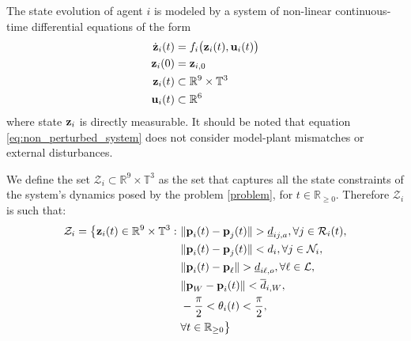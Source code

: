 The state evolution of agent $i$ is modeled by a system of non-linear
continuous-time differential equations of the form
\begin{align}
  \dot{\bm{\mathbf{z}}}_i(t) &= f_i \big(\bm{\mathbf{z}}_i (t), \bm{\mathbf{u}}_i (t)\big) \label{eq:non_perturbed_system}\\
  \bm{\mathbf{z}}_i(0) &= \bm{\mathbf{z}}_{i,0} \\
  \bm{\mathbf{z}}_i (t) & \subset \mathbb{R}^{9} \times \mathbb{T}^3 \\
  \bm{\mathbf{u}}_i (t) & \subset \mathbb{R}^6
\end{align}
where state $\bm{\mathbf{z}}_i$ is directly measurable. It should be noted that
equation \eqref{eq:non_perturbed_system} does not consider model-plant
mismatches or external disturbances.

We define the set $\mathcal{Z}_i \subset \mathbb{R}^{9} \times \mathbb{T}^3$
as the set that captures all the state constraints of the system's dynamics
posed by the problem \eqref{problem}, for $t \in \mathbb{R}_{\geq 0}$.
Therefore $\mathcal{Z}_i$ is such that:
\begin{align}
  \mathcal{Z}_i = \big\{\bm{\mathbf{z}}_i(t) \in \mathbb{R}^{9}\times \mathbb{T}^3 : \
      & \|\bm{\mathbf{p}}_i(t) - \bm{\mathbf{p}}_j(t)\| > \underline{d}_{ij,a}, \forall j \in \mathcal{R}_i(t), \label{constraint:p_1}\\
      & \|\bm{\mathbf{p}}_i(t) - \bm{\mathbf{p}}_j(t)\| < d_i, \forall j \in \mathcal{N}_i, \\
      & \|\bm{\mathbf{p}}_i(t) - \bm{\mathbf{p}}_{\ell}\| > \underline{d}_{i\ell,o}, \forall \ell \in \mathcal{L}, \\
      & \|\bm{\mathbf{p}}_W - \bm{\mathbf{p}}_i(t)\| < \overline{d}_{i,W}, \\
      & - \frac{\pi}{2} < \theta_i(t) < \frac{\pi}{2} \label{constraint:p_5}, \\
      &\forall t \in \mathbb{R}_{\geq 0}\big\}
\end{align}
